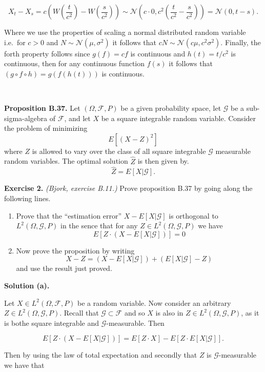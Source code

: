 \documentclass[
]{article}
\providecommand{\tightlist}{%
  \setlength{\itemsep}{0pt}\setlength{\parskip}{0pt}}
\begin{document}
\[X_t-X_s=c\left(W\left(\frac{t}{c^2}\right)-W\left(\frac{s}{c^2}\right)\right)\sim\mathcal{N}\left(c\cdot 0,c^2\left(\frac{t}{c^2}-\frac{s}{c^2}\right)\right)=\mathcal{N}(0,t-s).\]

Where we use the properties of scaling a normal distributed random
variable i.e.~for \(c>0\) and \(N\sim\mathcal{N}(\mu,\sigma ^2)\) it
follows that \(c N\sim\mathcal{N}(c\mu,c^2\sigma ^2)\). Finally, the
forth property follows since \(g(f)=cf\) is continuous and
\(h(t)=t/c^2\) is continuous, then for any continuous function \(f(s)\)
it follows that \((g \circ f\circ h)=g(f(h(t)))\) is continuous.

~

\textbf{Proposition B.37.} Let \((\Omega,\mathcal{F},P)\) be a given
probability space, let \(\mathcal{G}\) be a sub-sigma-algebra of
\(\mathcal{F}\), and let \(X\) be a square integrable random variable.
Consider the problem of minimizing \[E\left[(X-Z)^2\right]\] where \(Z\)
is allowed to vary over the class of all square integrable
\(\mathcal{G}\) measurable random variables. The optimal solution
\(\hat{Z}\) is then given by. \[\hat{Z}=E[X\vert\mathcal{G}].\]

\textbf{Exercise 2.} \emph{(Bjork, exercise B.11.)} Prove proposition
B.37 by going along the following lines.

\begin{enumerate}
\def\labelenumi{\alph{enumi}.}
\tightlist
\item
  Prove that the ``estimation error'' \(X-E[X\vert\mathcal{G}]\) is
  orthogonal to \(L^2(\Omega,\mathcal{G},P)\) in the sence that for any
  \(Z\in L^2(\Omega,\mathcal{G},P)\) we have
  \[E[Z\cdot(X-E[X\vert\mathcal{G}])]=0\]
\item
  Now prove the proposition by writing
  \[X-Z=(X-E[X\vert\mathcal{G}])+(E[X\vert\mathcal{G}]-Z)\] and use the
  result just proved.
\end{enumerate}

\textbf{Solution (a).}

Let \(X\in L^2(\Omega,\mathcal{F},P)\) be a random variable. Now
consider an arbitrary \(Z\in L^2(\Omega,\mathcal{G},P)\). Recall that
\(\mathcal{G}\subset \mathcal{F}\) and so \(X\) is also in
\(Z\in L^2(\Omega,\mathcal{G},P)\), as it is bothe square integrable and
\(\mathcal{G}\)-measurable. Then

\[E\left[Z\cdot(X-E[X\vert\mathcal{G}])\right]=E\left[Z\cdot X\right]-E\left[Z\cdot E[X\vert\mathcal{G}]\right].\]

Then by using the law of total expectation and secondly that \(Z\) is
\(\mathcal{G}\)-measurable we have that
\end{document}
